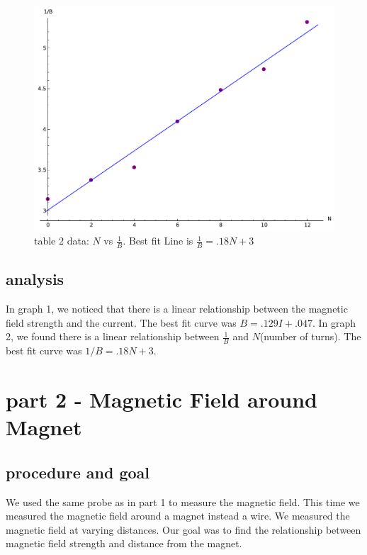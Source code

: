 \documentclass[12pt]{article}
\begin{document}
	\begin{figure}[hp]
	 \centering
	 \includegraphics[scale = .85]{plot2}
	 \caption*{table 2 data: $N$ vs $\frac{1}{B}$. Best fit Line is $ \frac{1}{B} = .18N + 3 $}
	\end{figure}
	\FloatBarrier

\subsection*{analysis}
In graph 1, we noticed that there is a linear relationship between the magnetic field strength and the current. The best fit curve was $B=.129I+.047$. In graph 2, we found there is  a linear relationship between $\frac{1}{B}$ and $N$(number of turns). The best fit curve was $1/B=.18N+3$.



\section*{part 2 - Magnetic Field around Magnet}

\subsection*{procedure and goal}

We used the same probe as in part 1 to measure the magnetic field. This time we measured the magnetic field around a magnet instead a wire. We measured the magnetic field at varying distances. Our goal was to find the relationship between magnetic field strength and distance from the magnet.  
\end{document}
